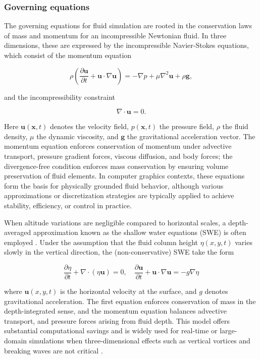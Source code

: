 \subsubsection{Governing equations}
The governing equations for fluid simulation are rooted in the conservation laws of mass and momentum for an incompressible Newtonian fluid. In three dimensions, these are expressed by the incompressible Navier-Stokes equations, which consist of the momentum equation

$$
\rho \left(\frac{\partial \mathbf{u}}{\partial t} + \mathbf{u}\cdot\nabla\mathbf{u}\right) = -\nabla p + \mu \nabla^2 \mathbf{u} + \rho \mathbf{g},
$$

and the incompressibility constraint

$$
\nabla\cdot\mathbf{u} = 0.
$$

Here $\mathbf{u}(\mathbf{x},t)$ denotes the velocity field, $p(\mathbf{x},t)$ the pressure field, $\rho$ the fluid density, $\mu$ the dynamic viscosity, and $\mathbf{g}$ the gravitational acceleration vector. The momentum equation enforces conservation of momentum under advective transport, pressure gradient forces, viscous diffusion, and body forces; the divergence-free condition enforces mass conservation by ensuring volume preservation of fluid elements. In computer graphics contexts, these equations form the basis for physically grounded fluid behavior, although various approximations or discretization strategies are typically applied to achieve stability, efficiency, or control in practice.

When altitude variations are negligible compared to horizontal scales, a depth-averaged approximation known as the shallow water equations (SWE) is often employed \cite{Parna2019}. Under the assumption that the fluid column height $\eta(x,y,t)$ varies slowly in the vertical direction, the (non-conservative) SWE take the form

$$
\frac{\partial \eta}{\partial t} + \nabla\cdot(\eta \mathbf{u}) = 0, 
\quad
\frac{\partial \mathbf{u}}{\partial t} + \mathbf{u} \cdot \nabla \mathbf{u} = - g \nabla \eta
$$

where $\mathbf{u}(x,y,t)$ is the horizontal velocity at the surface, and $g$ denotes gravitational acceleration. %
The first equation enforces conservation of mass in the depth-integrated sense, and the momentum equation balances advective transport, and pressure forces arising from fluid depth. %
This model offers substantial computational savings and is widely used for real-time or large-domain simulations when three-dimensional effects such as vertical vortices and breaking waves are not critical \cite{Parna2019}. %

